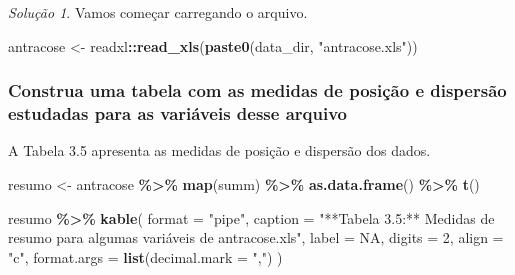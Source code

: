 \documentclass[
]{latex/krantz}
\newenvironment{Shaded}{\begin{snugshade}}{\end{snugshade}}
\newcommand{\AttributeTok}[1]{\textcolor[rgb]{0.13,0.29,0.53}{#1}}
\newcommand{\ConstantTok}[1]{\textcolor[rgb]{0.56,0.35,0.01}{#1}}
\newcommand{\DecValTok}[1]{\textcolor[rgb]{0.00,0.00,0.81}{#1}}
\newcommand{\FunctionTok}[1]{\textcolor[rgb]{0.13,0.29,0.53}{\textbf{#1}}}
\newcommand{\NormalTok}[1]{#1}
\newcommand{\OtherTok}[1]{\textcolor[rgb]{0.56,0.35,0.01}{#1}}
\newcommand{\SpecialCharTok}[1]{\textcolor[rgb]{0.81,0.36,0.00}{\textbf{#1}}}
\newcommand{\StringTok}[1]{\textcolor[rgb]{0.31,0.60,0.02}{#1}}
\theoremstyle{definition}
\theoremstyle{definition}
\theoremstyle{definition}
\theoremstyle{definition}
\theoremstyle{remark}
\newtheorem*{solution}{Solução}
\begin{document}
\begin{solution}

Vamos começar carregando o arquivo.

\begin{Shaded}
\begin{Highlighting}[]
\NormalTok{antracose }\OtherTok{\textless{}{-}}\NormalTok{ readxl}\SpecialCharTok{::}\FunctionTok{read\_xls}\NormalTok{(}\FunctionTok{paste0}\NormalTok{(data\_dir, }\StringTok{"antracose.xls"}\NormalTok{))}
\end{Highlighting}
\end{Shaded}

\hypertarget{construa-uma-tabela-com-as-medidas-de-posiuxe7uxe3o-e-dispersuxe3o-estudadas-para-as-variuxe1veis-desse-arquivo}{%
\subsubsection*{Construa uma tabela com as medidas de posição e dispersão estudadas para as variáveis desse arquivo}\label{construa-uma-tabela-com-as-medidas-de-posiuxe7uxe3o-e-dispersuxe3o-estudadas-para-as-variuxe1veis-desse-arquivo}}

A Tabela 3.5 apresenta as medidas de posição e dispersão dos dados.

\begin{Shaded}
\begin{Highlighting}[]
\NormalTok{resumo }\OtherTok{\textless{}{-}}\NormalTok{ antracose }\SpecialCharTok{\%\textgreater{}\%}
            \FunctionTok{map}\NormalTok{(summ) }\SpecialCharTok{\%\textgreater{}\%}
            \FunctionTok{as.data.frame}\NormalTok{() }\SpecialCharTok{\%\textgreater{}\%}
            \FunctionTok{t}\NormalTok{()}

\NormalTok{resumo }\SpecialCharTok{\%\textgreater{}\%}
  \FunctionTok{kable}\NormalTok{(}
    \AttributeTok{format =} \StringTok{"pipe"}\NormalTok{,}
    \AttributeTok{caption =} \StringTok{"**Tabela 3.5:** Medidas de resumo para algumas variáveis de \textasciigrave{}antracose.xls\textasciigrave{}"}\NormalTok{,}
    \AttributeTok{label =} \ConstantTok{NA}\NormalTok{,}
    \AttributeTok{digits =} \DecValTok{2}\NormalTok{,}
    \AttributeTok{align =} \StringTok{"c"}\NormalTok{,}
    \AttributeTok{format.args =} \FunctionTok{list}\NormalTok{(}\AttributeTok{decimal.mark =} \StringTok{","}\NormalTok{)}
\NormalTok{  )}
\end{Highlighting}
\end{Shaded}


\end{solution}
\end{document}

